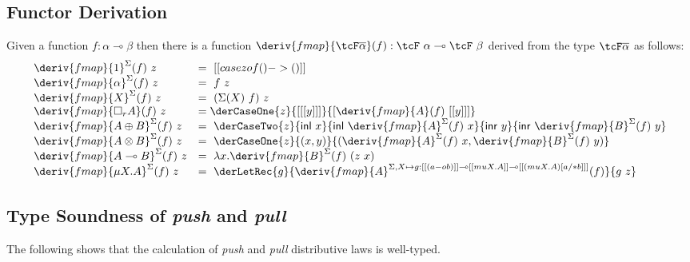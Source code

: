 \subsection{Functor Derivation}
\label{app:functor-derivation}

\begin{definition}
Given a function $f : \alpha \multimap \beta$ then
there is a function $\deriv{fmap}{\tcF \overline{\alpha}}(f)
: \tcF\ \alpha \multimap \tcF\ \beta$ derived from the type
$\tcF \overline{\alpha}$ as follows:
%
\begin{align*}
  \begin{array}{ll}
  \deriv{fmap}{1}^\Sigma(f)\ z &= \ [[ case z of () -> () ]]\\
  \deriv{fmap}{\alpha}^\Sigma(f)\ z &= \ f\ z\\
  \deriv{fmap}{X}^\Sigma(f)\ z &= \ (\Sigma(X)\ f)\ z \\
  \deriv{fmap}{\Box_{r}A}(f)\ z &= \derCaseOne{z}{ [[ [y] ]] }{ [ \deriv{fmap}{A}(f)\  [[ y ]] ] } \\
  \deriv{fmap}{A \oplus B}^\Sigma(f)\ z &= \ \derCaseTwo{z}{\mathsf{inl}\
                                       x}{\mathsf{inl}\ \deriv{fmap}{A}^\Sigma(f)\ x}{\mathsf{inr}\ y}
                            {\mathsf{inr}\ \deriv{fmap}{B}^\Sigma(f)\ y}
\\
  \deriv{fmap}{A \otimes B}^\Sigma(f)\ z &= \ \derCaseOne{z}{(x, y)}
   {( \deriv{fmap}{A}^\Sigma(f)\ x, \deriv{fmap}{B}^\Sigma(f)\ y )} \\
  \deriv{fmap}{A \multimap B}^\Sigma(f)\ z &= \  \lambda x . \deriv{fmap}{B}^\Sigma(f)\ (z\ x) \\
  \deriv{fmap}{\mu X . A}^\Sigma(f)\ z &= \ \derLetRec{g}{\deriv{fmap}{A}^{\Sigma, X \mapsto
g : [[ (a -o b) ]] \multimap [[ {mu X . A} ]] \multimap [[ {{(mu X . A)} [ a /* b ]} ]] }(f)}{g\ z}
    \end{array}
\end{align*}
\end{definition}

\subsection{Type Soundness of \emph{push} and \emph{pull}}
\label{proof:deriving-type-soundness}
%
The following shows that the calculation of \emph{push}
and \emph{pull} distributive laws is well-typed.



